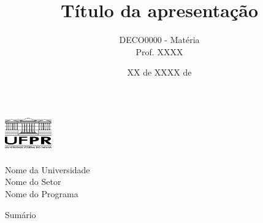\documentclass[aspectratio=169, 9pt]{beamer}
\title[short-title]{Título da apresentação}
\author[Nome do autor]{DECO0000 - Matéria \\ Prof. XXXX}
\institute[] %
{
    \vspace{0.5mm} {\normalsize Nome do autor} \vspace{5mm}
}
\date{XX de XXXX de \the\year{}}
\begin{document}
\begin{frame}[plain]
    \begin{center}
            \begin{minipage}[c]{0.2\linewidth}
                    \begin{center}
                    \includegraphics[width=2cm, height=1.7cm]{./Imagens/logo_UFPR.png} 
                    \end{center}
            \end{minipage}
            \begin{minipage}[c]{0.7\linewidth}
                    \begin{flushleft}
                    \begin{large}
                    Nome da Universidade \\ \vspace{1mm} Nome do Setor\\
                    \vspace{1mm} Nome do Programa
                    \end{large} 
                    \end{flushleft}
            \end{minipage}
    \end{center}
\titlepage 
\end{frame}


\begingroup
{}
\begin{frame}{Sumário}
	\tableofcontents[hideallsubsections]
\end{frame}
\endgroup




\nocite{*}






\end{document}
